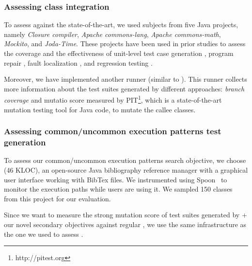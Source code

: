 \subsubsection{Assessing class integration} 
To assess \cling against the state-of-the-art, we used subjects from five Java projects, namely \textit{Closure compiler}, \textit{Apache commons-lang}, \textit{Apache commons-math}, \textit{Mockito}, and \textit{Joda-Time}. These 
projects have been used in prior studies to assess the coverage and the effectiveness of unit-level test case generation \cite{ma2015grt, Panichella2018, just2014defects4j, Shamshiri2016}, program repair \cite{smith2015cure, martinez2016astor}, fault localization \cite{pearson2017evaluating, b2016learning}, and regression testing \cite{noor2015similarity, lu2016does}.

Moreover, we have implemented another runner (similar to \exrunner). This runner collects more information about the test suites generated by different approaches: \textit{branch coverage} and mutatio score measured by PIT\footnote{http://pitest.org}, which is a state-of-the-art mutation testing tool for Java code, to mutate the callee classes.

\subsubsection{Assessing common/uncommon execution patterns test generation} 

To assess our common/uncommon execution patterns search objective, we choose \jabref (46 KLOC), an open-source Java bibliography reference manager with a graphical user interface working with BibTex files. We instrumented \jabref using Spoon~\cite{pawlak:hal-01169705} to monitor the execution paths while users are using it. We sampled 150 classes from this project for our evaluation.

Since we want to measure the strong mutation score of test suites generated by \evosuite + our novel secondary objectives against regular \evosuite, we use the same infrastructure as the one we used to assess \cling.